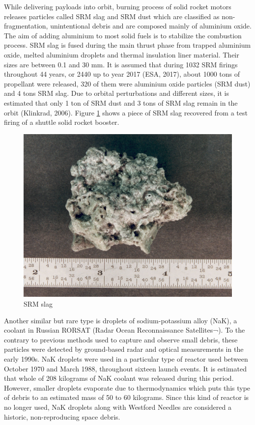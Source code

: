 	While delivering payloads into orbit, burning process of solid rocket motors releases particles called SRM slag and SRM dust which are classified as non-fragmentation, unintentional debris and are composed mainly of aluminium oxide. The aim of adding aluminium to most solid fuels is to stabilize the combustion process. SRM slag is fused during the main thrust phase from trapped aluminium oxide, melted aluminium droplets and thermal insulation liner material. Their sizes are between 0.1 and 30 mm. It is assumed that during 1032 SRM firings throughout 44 years, or 2440 up to year 2017 (ESA, 2017), about 1000 tons of propellant were released, 320 of them were aluminium oxide particles (SRM dust) and 4 tons SRM slag. Due to orbital perturbations and different sizes, it is estimated that only 1 ton of SRM dust and 3 tons of SRM slag remain in the orbit (Klinkrad, 2006). Figure \ref{fig:srmslag} shows a piece of SRM slag recovered from a test firing of a shuttle solid rocket booster.
	
\begin{figure}[H]
  \includegraphics[width=\linewidth]{images/slag}
  \caption{SRM slag}
  \label{fig:srmslag}
\end{figure}	
	
	Another similar but rare type is droplets of sodium-potassium alloy (NaK), a coolant in Russian RORSAT (Radar Ocean Reconnaissance Satellites¬). To the contrary to previous methods used to capture and observe small debris, these particles were detected by ground-based radar and optical measurements in the early 1990s. NaK droplets were used in a particular type of reactor used between October 1970 and March 1988, throughout sixteen launch events. It is estimated that whole of 208 kilograms of NaK coolant was released during this period. However, smaller droplets evaporate due to thermodynamics which puts this type of debris to an estimated mass of 50 to 60 kilograms. Since this kind of reactor is no longer used, NaK droplets along with Westford Needles are considered a historic, non-reproducing space debris. 
	
